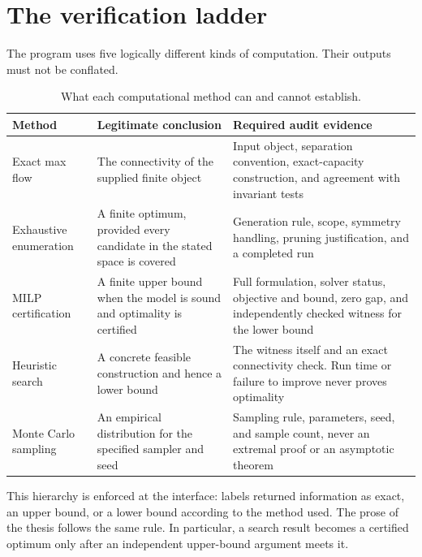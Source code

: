 \section{The verification ladder}\label{app:verification-ladder}

The program uses five logically different kinds of computation. Their outputs must not be conflated.

\begin{table}[ht]
  \centering
  \small
  \begin{tabularx}{\textwidth}{@{}>{\raggedright\arraybackslash}p{}>{\raggedright\arraybackslash}p{}>{\raggedright\arraybackslash}X@{}}
    \toprule
    Method & Legitimate conclusion & Required audit evidence \\
    \midrule
    Exact max flow & The connectivity of the supplied finite object & Input object, separation convention, exact-capacity construction, and agreement with invariant tests \\
    Exhaustive enumeration & A finite optimum, provided every candidate in the stated space is covered & Generation rule, scope, symmetry handling, pruning justification, and a completed run \\
    MILP certification & A finite upper bound when the model is sound and optimality is certified & Full formulation, solver status, objective and bound, zero gap, and independently checked witness for the lower bound \\
    Heuristic search & A concrete feasible construction and hence a lower bound & The witness itself and an exact connectivity check. Run time or failure to improve never proves optimality \\
    Monte Carlo sampling & An empirical distribution for the specified sampler and seed & Sampling rule, parameters, seed, and sample count, never an extremal proof or an asymptotic theorem \\
    \bottomrule
  \end{tabularx}
  \caption{What each computational method can and cannot establish.}
  \label{tab:software-evidence}
\end{table}

This hierarchy is enforced at the interface:  labels returned information as exact, an upper bound, or a lower bound according to the method used. The prose of the thesis follows the same rule. In particular, a search result becomes a certified optimum only after an independent upper-bound argument meets it.

